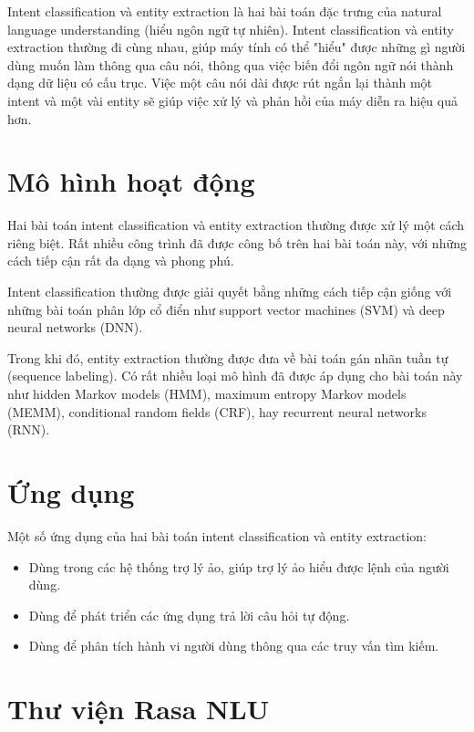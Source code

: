 Intent classification và entity extraction là hai bài toán đặc trưng của natural language understanding (hiểu ngôn ngữ tự nhiên). Intent classification và entity extraction thường đi cùng nhau, giúp máy tính có thể "hiểu" được những gì người dùng muốn làm thông qua câu nói, thông qua việc biến đổi ngôn ngữ nói thành dạng dữ liệu có cấu trục. Việc một câu nói dài được rút ngắn lại thành một intent và một vài entity sẽ giúp việc xử lý và phản hồi của máy diễn ra hiệu quả hơn.

\section{Mô hình hoạt động}

Hai bài toán intent classification và entity extraction thường được xử lý một cách riêng biệt. Rất nhiều công trình đã được công bố trên hai bài toán này, với những cách tiếp cận rất đa dạng và phong phú.

Intent classification thường được giải quyết bằng những cách tiếp cận giống với những bài toán phân lớp cổ điển như support vector machines (SVM) và deep neural networks (DNN).

Trong khi đó, entity extraction thường được đưa về bài toán gán nhãn tuần tự (sequence labeling). Có rất nhiều loại mô hình đã được áp dụng cho bài toán này như hidden Markov models (HMM), maximum entropy Markov models (MEMM), conditional random fields (CRF), hay recurrent neural networks (RNN).

\section{Ứng dụng}

Một số ứng dụng của hai bài toán intent classification và entity extraction:

\begin{itemize}
    \item Dùng trong các hệ thống trợ lý ảo, giúp trợ lý ảo hiểu được lệnh của người dùng.
    \item Dùng để phát triển các ứng dụng trả lời câu hỏi tự động.
    \item Dùng để phân tích hành vi người dùng thông qua các truy vấn tìm kiếm.
\end{itemize}

\section{Thư viện Rasa NLU}

